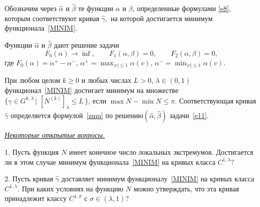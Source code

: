 Обозначим через
$\widehat{\alpha}$ и $\widehat{\beta}$ те функции $\alpha$ и
$\beta$, определенные формулами \eqref{e8}, которым соответствуют
кривая $\widehat{\gamma},$ на которой
достигается минимум функционала~\eqref{MINIM}. 
\begin{theorem}
Функции $\widehat{\alpha}$ и $\widehat{\beta}$ дают решение задачи
\begin{equation}
\label{e11} F_0(\alpha)\to \inf,\qquad F_1(\alpha,\beta)=0,\qquad
F_2(\alpha,\beta)=0,
\end{equation}
где $ F_0(\alpha)= \alpha^+ - \alpha^-$, $\alpha^+ = \max_{|v|\le 1}\alpha(v)$,
$\alpha^- = \min_{|v|\le 1}\alpha(v)$.
\end{theorem}
\begin{theorem}
 \label{Th2}
При любом целом $k\ge 0$ и любых числах $L>0$,\; $\lambda
\in (0,1)$ функционал~\eqref{MINIM} достигает минимум на множестве
$\{\gamma\in G^{k,\lambda}\,|\,\,[ N^{(k)}]_{\lambda} \le L\,\}$,
если $\max N -\min N \le\pi$.
Соответствующая кривая $\widehat{\gamma}$ определяется
формулой~\eqref{zmu} по
решению$(\widehat{\alpha},\widehat{\beta})$ задачи~\eqref{e11}.
\end{theorem}

\noindent\underline{\it Некоторые открытые вопросы.}

\medskip
\footnotesize{
1. Пусть функция $N$ имеет конечное число локальных
экстремумов. Достигается ли в этом случае минимум
функционала~\eqref{MINIM} на кривых класса $C^{1,\lambda}?$

2. Пусть кривая $\widehat{\gamma}$ доставляет минимум
функционалу~\eqref{MINIM} на кривых класса $C^{1,\lambda}.$ При
каких условиях на функцию $N$ можно утверждать, что эта кривая
принадлежит классу $C^{1,\sigma}$ с $\sigma\in(\lambda,1)?$
\par} \normalsize





%

